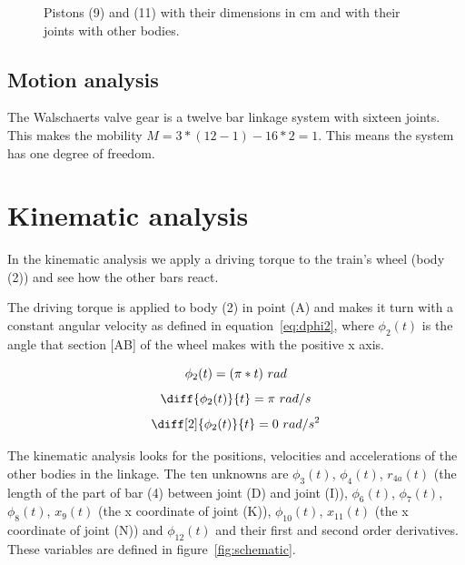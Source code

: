 \documentclass[a4paper]{article}
\begin{document}
\begin{figure}[b]
	\caption{Pistons (9) and (11) with their dimensions in cm and with their joints with other bodies.}
	\label{fig:pistons}
	
\end{figure}



\subsection{Motion analysis}

The Walschaerts valve gear is a twelve bar linkage system with sixteen joints. This makes the mobility \(M=3*(12-1)-16*2=1\). This means the system has one degree of freedom.


\section{Kinematic analysis}
\label{sec:kin}

In the kinematic analysis we apply a driving torque to the train's wheel (body (2)) and see how the other bars react. 

The driving torque is applied to body (2) in point (A) and makes it turn with a constant angular velocity as defined in equation~\ref{eq:dphi2}, where \(\phi_2(t)\) is the angle that section [AB] of the wheel makes with the positive x axis.

\begin{equation}
	\phi_2(t) = (\pi*t)~rad \\
	\label{eq:phi2}
\end{equation}
\begin{equation}
	\diff{\phi_2(t)}{t} = \pi~rad/s \\
	\label{eq:dphi2}
\end{equation}
\begin{equation}
	\diff[2]{\phi_2(t)}{t} = 0~rad/s^2\\
\end{equation}

The kinematic analysis looks for the positions, velocities and accelerations of the other bodies in the linkage. The ten unknowns are \(\phi_3(t)\), \(\phi_4(t)\), \(r_{4a}(t)\) (the length of the part of bar (4) between joint (D) and joint (I)), \(\phi_6(t)\), \(\phi_7(t)\), \(\phi_8(t)\), \(x_9(t)\) (the x coordinate of joint (K)), \(\phi_{10}(t)\), \(x_{11}(t)\) (the x coordinate of joint (N)) and \(\phi_{12}(t)\) and their first and second order derivatives. These variables are defined in figure~\ref{fig:schematic}.
\end{document}

